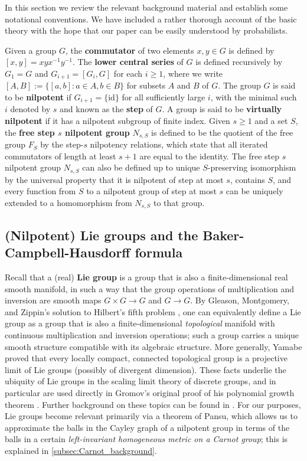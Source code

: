 \documentclass[11pt]{article}
\numberwithin{equation}{section}
\theoremstyle{plain}
\theoremstyle{definition}
\theoremstyle{remark}
\numberwithin{equation}{section}
\numberwithin{equation}{section}
\begin{document}
In this section we review the relevant background material and establish some notational conventions. We have included a rather thorough account of the basic theory with the hope that our paper can be easily understood by probabilists. 

\medskip

Given a group $G$, the \textbf{commutator} of two elements $x,y\in G$ is defined by $[x,y]=xyx^{-1}y^{-1}$. The \textbf{lower central series} of $G$ is defined recursively by $G_1=G$ and $G_{i+1}=[G_i,G]$ for each $i\geq 1$, where we write $[A,B]:=\{[a,b]:a\in A, b\in B\}$ for subsets $A$ and $B$ of $G$. The group $G$ is said to be \textbf{nilpotent} if $G_{i+1}=\{\mathrm{id}\}$ for all sufficiently large $i$, with the minimal such $i$ denoted by $s$ and known as the \textbf{step} of $G$. A group is said to be \textbf{virtually nilpotent} if it has a nilpotent subgroup of finite index. Given $s\geq 1$ and a set $S$, the \textbf{free step $s$ nilpotent group} $N_{s,S}$ is defined to be the quotient of the free group $F_S$ by the step-$s$ nilpotency relations, which state that all iterated commutators of length at least $s+1$ are equal to the identity. 
%
 The free step $s$ nilpotent group $N_{s,S}$ can also be defined up to unique $S$-preserving isomorphism by the universal property that it is nilpotent of step at most $s$, contains $S$, and every function from $S$ to a nilpotent group of step at most $s$ can be uniquely extended to a homomorphism from $N_{s,S}$ to that group.

\subsection{(Nilpotent) Lie groups and the Baker-Campbell-Hausdorff formula}

Recall that a (real) \textbf{Lie group} is a group that is also a finite-dimensional real smooth manifold, in such a way that the group operations of multiplication and inversion are smooth maps $G\times G \to G$ and $G\to G$. By Gleason, Montgomery, and Zippin's solution to Hilbert's fifth problem \cite{MR49204,MR49203}, one can equivalently define a Lie group as a group that is also a finite-dimensional \emph{topological} manifold with continuous multiplication and inversion operations; such a group carries a unique smooth structure compatible with its algebraic structure. More generally, Yamabe \cite{MR36766} proved that every locally compact, connected topological group is a projective limit of Lie groups (possibly of divergent dimension). These facts underlie the ubiquity of Lie groups in the scaling limit theory of discrete groups, and in particular are used directly in Gromov's original proof of his polynomial growth theorem \cite{gromov81poly}. Further background on these topics can be found in \cite{MR3237440}. For our purposes, Lie groups become relevant primarily via a theorem of Pansu, which allows us to approximate the balls in the Cayley graph of a nilpotent group in terms of the balls in a certain \emph{left-invariant homogeneous metric on a Carnot group}; this is explained in \cref{subsec:Carnot_background}.
\end{document}
